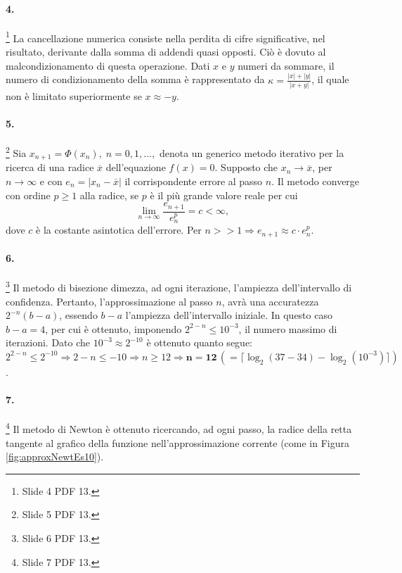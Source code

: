 \paragraph{4.}\footnote{Slide 4 PDF 13.} La cancellazione numerica consiste nella perdita di cifre significative, nel risultato, derivante dalla somma di addendi quasi opposti. Ciò è dovuto al malcondizionamento di questa operazione. Dati $x$ e $y$ numeri da sommare, il numero di condizionamento della somma è rappresentato da $\kappa=\frac{|x|+|y|}{|x+y|}$, il quale non è limitato superiormente se $x\approx -y$. 

\paragraph{5.}\footnote{Slide 5 PDF 13.} Sia $x_{n+1}=\Phi(x_n),\; n=0,1,\hdots,$ denota un generico metodo iterativo per la ricerca di una radice $\overline{x}$ dell'equazione $f(x)=0$. Supposto che $x_n\rightarrow\overline{x}$, per $n\rightarrow\infty$ e con $e_n=|x_n-\overline{x}|$ il corrispondente errore al passo $n$. Il metodo converge con ordine $p\geq 1 $ alla radice, se $p$ è il più grande valore reale per cui 
\begin{equation*}
	\lim_{n\rightarrow\infty}\frac{e_{n+1}}{e_n^p}=c<\infty,
\end{equation*}
dove $c$ è la costante asintotica dell'errore. Per $n>>1\Rightarrow e_{n+1}\approx c\cdot e_n^p$.

\paragraph{6.}\footnote{Slide 6 PDF 13.} Il metodo di bisezione dimezza, ad ogni iterazione, l'ampiezza dell'intervallo di confidenza. Pertanto, l'approssimazione al passo $n$, avrà una accuratezza $2^{-n}(b-a)$, essendo $b-a$ l'ampiezza dell'intervallo iniziale. In questo caso $b-a=4$, per cui è ottenuto, imponendo $2^{2-n}\leq 10^{-3}$, il numero massimo di iterazioni. Dato che $10^{-3}\approx 2^{-10}$ è ottenuto quanto segue: $2^{2-n}\leq 2^{-10}\Rightarrow 2-n\leq -10\Rightarrow n\geq 12 \Rightarrow\boldsymbol{n=12}\, \left(= \lceil\log_2(37-34)-\log_2(10^{-3})\rceil\right)$.

\paragraph{7.}\footnote{Slide 7 PDF 13.} Il metodo di Newton è ottenuto ricercando, ad ogni passo, la radice della retta tangente al grafico della funzione nell'approssimazione corrente (come in Figura \ref{fig:approxNewtEs10}).

